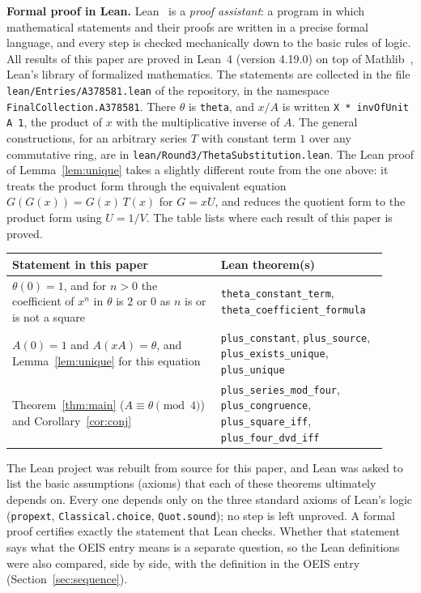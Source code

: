 \documentclass[11pt,a4paper]{article}
\theoremstyle{definition}
\theoremstyle{remark}
\newcommand{\para}[1]{\par\medskip\noindent\textbf{#1}\enspace}
\begin{document}
\para{Formal proof in Lean.}
Lean~\cite{lean} is a \emph{proof assistant}: a program in which mathematical statements and their proofs are written
in a precise formal language, and every step is checked mechanically down to the basic rules of logic. All results of
this paper are proved in Lean~4 (version 4.19.0) on top of Mathlib~\cite{mathlib}, Lean's library of formalized
mathematics. The statements are collected in the file \texttt{lean/Entries/A378581.lean} of the repository,
in the namespace \texttt{FinalCollection.A378581}. There $\theta$ is \texttt{theta}, and $x/A$ is written \texttt{X * invOfUnit A 1}, the product of
$x$ with the multiplicative inverse of $A$. The general constructions, for an arbitrary series $T$ with constant term $1$
over any commutative ring, are in \texttt{lean/Round3/ThetaSubstitution.lean}. The Lean proof of Lemma~\ref{lem:unique}
takes a slightly different route from the one above: it treats the product form through the equivalent equation
$G(G(x))=G(x)\,T(x)$ for $G=xU$, and reduces the quotient form to the product form using $U=1/V$.
The table lists where each result of this paper is proved.
\begin{center}\small\renewcommand{\arraystretch}{1.25}
\begin{tabular}{>{\raggedright\arraybackslash}p{0.52\linewidth}>{\raggedright\arraybackslash}p{0.4\linewidth}}
\toprule
Statement in this paper & Lean theorem(s)\\
\midrule
$\theta(0)=1$, and for $n>0$ the coefficient of $x^n$ in $\theta$ is $2$ or $0$ as $n$ is or is not a square & \texttt{theta\_\allowbreak{}constant\_\allowbreak{}term}, \texttt{theta\_\allowbreak{}coefficient\_\allowbreak{}formula} \\
$A(0)=1$ and $A(xA)=\theta$, and Lemma~\ref{lem:unique} for this equation & \texttt{plus\_\allowbreak{}constant}, \texttt{plus\_\allowbreak{}source}, \texttt{plus\_\allowbreak{}exists\_\allowbreak{}unique}, \texttt{plus\_\allowbreak{}unique} \\
Theorem~\ref{thm:main} ($A\equiv\theta\pmod 4$) and Corollary~\ref{cor:conj} & \texttt{plus\_\allowbreak{}series\_\allowbreak{}mod\_\allowbreak{}four}, \texttt{plus\_\allowbreak{}congruence}, \texttt{plus\_\allowbreak{}square\_\allowbreak{}iff}, \texttt{plus\_\allowbreak{}four\_\allowbreak{}dvd\_\allowbreak{}iff} \\
\bottomrule
\end{tabular}
\end{center}
The Lean project was rebuilt from source for this paper, and Lean was asked to list the basic assumptions (axioms)
that each of these theorems ultimately depends on. Every one depends only on the three standard axioms of Lean's logic
(\texttt{propext}, \texttt{Classical.choice}, \texttt{Quot.sound}); no step is left unproved. A formal proof certifies
exactly the statement that Lean checks. Whether that statement says what the OEIS entry means is a separate question,
so the Lean definitions were also compared, side by side, with the definition in the OEIS entry
(Section~\ref{sec:sequence}).
\end{document}
